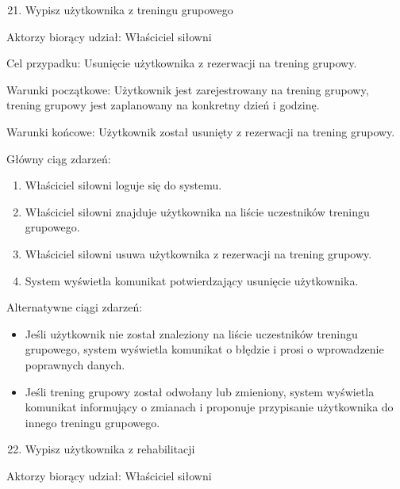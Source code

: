 \documentclass[
]{article}
\providecommand{\tightlist}{%
  \setlength{\itemsep}{0pt}\setlength{\parskip}{0pt}}
\begin{document}
{}

\begin{enumerate}
\setcounter{enumi}{20}
\tightlist
\item
  {Wypisz użytkownika z treningu grupowego}
\end{enumerate}

{Aktorzy biorący udział: Właściciel siłowni}

{Cel przypadku: Usunięcie użytkownika z rezerwacji na trening grupowy.}

{Warunki początkowe: Użytkownik jest zarejestrowany na trening grupowy,
trening grupowy jest zaplanowany na konkretny dzień i godzinę.}

{Warunki końcowe: Użytkownik został usunięty z rezerwacji na trening
grupowy.}

{Główny ciąg zdarzeń:}

\begin{enumerate}
\tightlist
\item
  {Właściciel siłowni loguje się do systemu.}
\item
  {Właściciel siłowni znajduje użytkownika na liście uczestników
  treningu grupowego.}
\item
  {Właściciel siłowni usuwa użytkownika z rezerwacji na trening
  grupowy.}
\item
  {System wyświetla komunikat potwierdzający usunięcie użytkownika.}
\end{enumerate}

{Alternatywne ciągi zdarzeń:}

\begin{itemize}
\tightlist
\item
  {Jeśli użytkownik nie został znaleziony na liście uczestników treningu
  grupowego, system wyświetla komunikat o błędzie i prosi o wprowadzenie
  poprawnych danych.}
\item
  {Jeśli trening grupowy został odwołany lub zmieniony, system wyświetla
  komunikat informujący o zmianach i proponuje przypisanie użytkownika
  do innego treningu grupowego.}
\end{itemize}

{}

{}

{}

\begin{enumerate}
\setcounter{enumi}{21}
\tightlist
\item
  {Wypisz użytkownika z rehabilitacji}
\end{enumerate}

{Aktorzy biorący udział: Właściciel siłowni}
\end{document}
